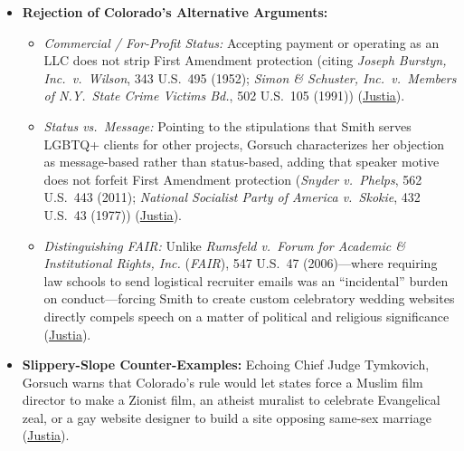 \documentclass[12pt]{article}
\begin{document}
\begin{itemize}
  \item \textbf{Rejection of Colorado's Alternative Arguments:}
    \begin{itemize}
      \item \emph{Commercial / For-Profit Status:} Accepting payment or operating as an LLC does not strip First Amendment protection (citing \textit{Joseph Burstyn, Inc.\ v.\ Wilson}, 343 U.S.\ 495 (1952); \textit{Simon \& Schuster, Inc.\ v.\ Members of N.Y.\ State Crime Victims Bd.}, 502 U.S.\ 105 (1991)) (\href{https://supreme.justia.com/cases/federal/us/600/21-476/}{Justia}).
      \item \emph{Status vs.\ Message:} Pointing to the stipulations that Smith serves LGBTQ+ clients for other projects, Gorsuch characterizes her objection as message-based rather than status-based, adding that speaker motive does not forfeit First Amendment protection (\textit{Snyder v.\ Phelps}, 562 U.S.\ 443 (2011); \textit{National Socialist Party of America v.\ Skokie}, 432 U.S.\ 43 (1977)) (\href{https://supreme.justia.com/cases/federal/us/600/21-476/}{Justia}).
      \item \emph{Distinguishing FAIR:} Unlike \textit{Rumsfeld v.\ Forum for Academic \& Institutional Rights, Inc.} (\textit{FAIR}), 547 U.S.\ 47 (2006)---where requiring law schools to send logistical recruiter emails was an ``incidental'' burden on conduct---forcing Smith to create custom celebratory wedding websites directly compels speech on a matter of political and religious significance (\href{https://supreme.justia.com/cases/federal/us/600/21-476/}{Justia}).
    \end{itemize}
  \item \textbf{Slippery-Slope Counter-Examples:} Echoing Chief Judge Tymkovich, Gorsuch warns that Colorado's rule would let states force a Muslim film director to make a Zionist film, an atheist muralist to celebrate Evangelical zeal, or a gay website designer to build a site opposing same-sex marriage (\href{https://supreme.justia.com/cases/federal/us/600/21-476/}{Justia}).
\end{itemize}
\end{document}

